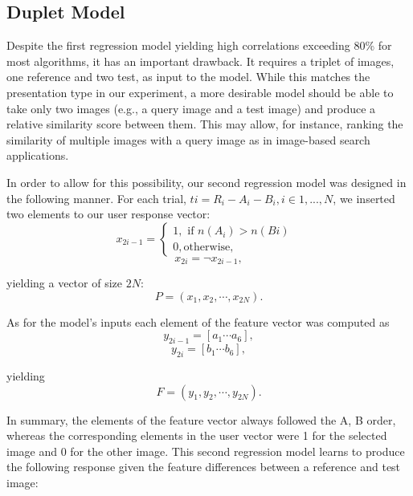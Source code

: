 \subsection{Duplet Model}
Despite the first regression model yielding high correlations exceeding 80\% for most algorithms, it has an important drawback. It requires a triplet of images, one reference and two test, as input to the model. While this matches the presentation type in our experiment, a more desirable model should be able to take only two images (e.g., a query image and a test image) and produce a relative similarity score between them. This may allow, for instance, ranking the similarity of multiple images with a query image as in image-based search applications.

In order to allow for this possibility, our second regression model was designed in the following manner.
For each trial, $ti = R_i - A_i - B_i, i \in {1, . . . , N}$, we inserted two elements to our user response vector:
\begin{equation}
    x_{2i-1} = \begin{cases} 
    1, \text{ if $n(A_i) > n(Bi)$ } \\
    0, \text{otherwise},
    \end{cases}
\end{equation}
\begin{equation}
    x_{2i} = \neg  x_{2i-1},
\end{equation}
    

yielding a vector of size $2N$:
\begin{equation}
   P = (x_1, x_2,\cdots, x_{2N} ). 
\end{equation}

As for the model’s inputs each element of the feature vector was computed as
\begin{equation}
    y_{2i-1} = [a_1 \cdots a_6], 
\end{equation}
\begin{equation}
    y_{2i} = [b_1 \cdots b_6], 
\end{equation}


yielding
\begin{equation}
    F = (y_1, y_2, \cdots , y_{2N} ).
\end{equation}

In summary, the elements of the feature vector always followed the A, B order, whereas the corresponding elements in the user vector were 1 for the selected image and 0 for the other image. This second regression model learns to produce the following response given the feature differences between a reference and test image:

